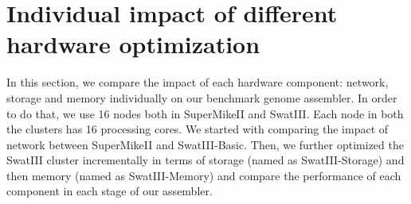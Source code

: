 \documentclass[conference]{IEEEtran}
\begin{document}
\section {Individual impact of different hardware optimization} 
In this section, we compare the impact of each hardware component: network, storage and memory individually on our benchmark genome assembler.
In order to do that, we use 16 nodes both in SuperMikeII and SwatIII. Each node in both the clusters has 16 processing cores.
We started with comparing the impact of network between SuperMikeII and SwatIII-Basic.
Then, we further optimized the SwatIII cluster incrementally in terms of storage (named as SwatIII-Storage) and then memory (named as SwatIII-Memory) and compare the performance of each component in each stage of our assembler.
\label{IndividualHWEffect}
\end{document}
